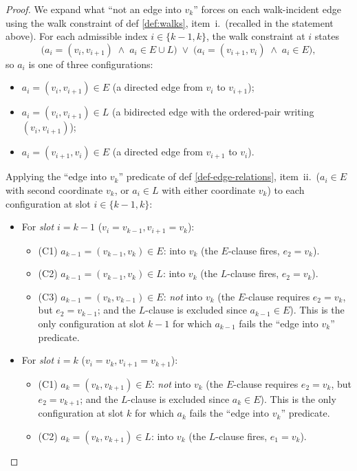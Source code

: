 \documentclass[main]{subfiles}
\begin{document}
\begin{proof}
We expand what ``not an edge into $v_k$'' forces on each walk-incident edge using the walk constraint of def \ref{def:walks}, item~i.\ (recalled in the statement above). For each admissible index $i \in \{k - 1, k\}$, the walk constraint at $i$ states
\[
    \bigl(a_i = (v_i, v_{i+1}) \;\land\; a_i \in E \cup L\bigr)
        \;\lor\;
    \bigl(a_i = (v_{i+1}, v_i) \;\land\; a_i \in E\bigr),
\]
so $a_i$ is one of three configurations:
\begin{itemize}
    \item[(C1)] $a_i = (v_i, v_{i+1}) \in E$ (a directed edge from $v_i$ to $v_{i+1}$);
    \item[(C2)] $a_i = (v_i, v_{i+1}) \in L$ (a bidirected edge with the ordered-pair writing $(v_i, v_{i+1})$);
    \item[(C3)] $a_i = (v_{i+1}, v_i) \in E$ (a directed edge from $v_{i+1}$ to $v_i$).
\end{itemize}
Applying the ``edge into $v_k$'' predicate of def \ref{def-edge-relations}, item~ii.\ ($a_i \in E$ with second coordinate $v_k$, or $a_i \in L$ with either coordinate $v_k$) to each configuration at slot $i \in \{k - 1, k\}$:
\begin{itemize}
    \item For \emph{slot $i = k - 1$} ($v_i = v_{k - 1}, v_{i+1} = v_k$):
    \begin{itemize}
        \item (C1) $a_{k-1} = (v_{k-1}, v_k) \in E$: into $v_k$ (the $E$-clause fires, $e_2 = v_k$).
        \item (C2) $a_{k-1} = (v_{k-1}, v_k) \in L$: into $v_k$ (the $L$-clause fires, $e_2 = v_k$).
        \item (C3) $a_{k-1} = (v_k, v_{k-1}) \in E$: \emph{not} into $v_k$ (the $E$-clause requires $e_2 = v_k$, but $e_2 = v_{k-1}$; and the $L$-clause is excluded since $a_{k-1} \in E$). This is the only configuration at slot $k - 1$ for which $a_{k - 1}$ fails the ``edge into $v_k$'' predicate.
    \end{itemize}
    \item For \emph{slot $i = k$} ($v_i = v_k, v_{i+1} = v_{k+1}$):
    \begin{itemize}
        \item (C1) $a_k = (v_k, v_{k+1}) \in E$: \emph{not} into $v_k$ (the $E$-clause requires $e_2 = v_k$, but $e_2 = v_{k+1}$; and the $L$-clause is excluded since $a_k \in E$). This is the only configuration at slot $k$ for which $a_k$ fails the ``edge into $v_k$'' predicate.
        \item (C2) $a_k = (v_k, v_{k+1}) \in L$: into $v_k$ (the $L$-clause fires, $e_1 = v_k$).

\end{itemize}
\end{itemize}
\end{proof}
\end{document}
